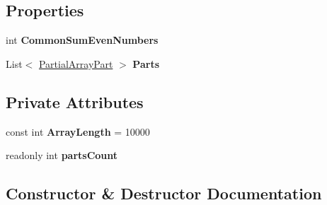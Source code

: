 \subsection*{Properties}
\begin{DoxyCompactItemize}
\item 
\mbox{\label{class_home_work_1_1_task_library_1_1_tasks_1_1_lesson13_1_1_classes_1_1_partial_array_abc42a788151447f0d3f14f1fb2da5d13}} 
int {\bfseries Common\+Sum\+Even\+Numbers}
\item 
\mbox{\label{class_home_work_1_1_task_library_1_1_tasks_1_1_lesson13_1_1_classes_1_1_partial_array_a6482728b50ebdc5309b1e807f34c9151}} 
List$<$ \mbox{\hyperlink{class_home_work_1_1_task_library_1_1_tasks_1_1_lesson13_1_1_classes_1_1_partial_array_part}{Partial\+Array\+Part}} $>$ {\bfseries Parts}
\end{DoxyCompactItemize}
\subsection*{Private Attributes}
\begin{DoxyCompactItemize}
\item 
\mbox{\label{class_home_work_1_1_task_library_1_1_tasks_1_1_lesson13_1_1_classes_1_1_partial_array_ab339528703035cc16aab47b6c5520a2e}} 
const int {\bfseries Array\+Length} = 10000
\item 
\mbox{\label{class_home_work_1_1_task_library_1_1_tasks_1_1_lesson13_1_1_classes_1_1_partial_array_a7847f9d69a074fc9339e6dfac6a69500}} 
readonly int {\bfseries parts\+Count}
\end{DoxyCompactItemize}


\subsection{Constructor \& Destructor Documentation}
\mbox{\label{class_home_work_1_1_task_library_1_1_tasks_1_1_lesson13_1_1_classes_1_1_partial_array_aef3476393c739dd83b981019aab0e24f}} 
